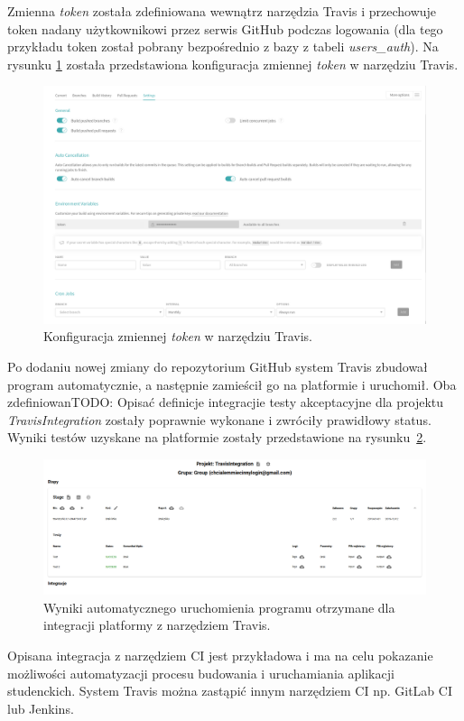 Zmienna \textit{token} została zdefiniowana wewnątrz narzędzia Travis i przechowuje token nadany użytkownikowi przez serwis GitHub podczas logowania (dla tego przykładu token został pobrany bezpośrednio z bazy z tabeli \textit{users\_auth}).
Na rysunku \ref{fig:travis_integration_internal} została przedstawiona konfiguracja zmiennej \textit{token} w narzędziu Travis.

\begin{figure}[h]
    \centering
    \includegraphics[width = 12cm]{chapter05/travis_integration_internal.png}
    \caption{Konfiguracja zmiennej \textit{token} w narzędziu Travis.}
    \label{fig:travis_integration_internal}
\end{figure}

Po dodaniu nowej zmiany do repozytorium GitHub system Travis zbudował program automatycznie, a następnie zamieścił go na platformie i uruchomił.
Oba zdefiniowanTODO: Opisać definicje integracjie testy akceptacyjne dla projektu \textit{TravisIntegration} zostały poprawnie wykonane i zwróciły prawidłowy status.
Wyniki testów uzyskane na platformie zostały przedstawione na rysunku~\ref{fig:travis_integration_result}.

\begin{figure}[h]
    \centering
    \includegraphics[width = 12cm]{chapter05/travis_integration_result.png}
    \caption{Wyniki automatycznego uruchomienia programu otrzymane dla integracji platformy z narzędziem Travis.}
    \label{fig:travis_integration_result}
\end{figure}

Opisana integracja z narzędziem CI jest przykładowa i ma na celu pokazanie możliwości automatyzacji procesu budowania i uruchamiania aplikacji studenckich.
System Travis można zastąpić innym narzędziem CI np. GitLab CI lub Jenkins.